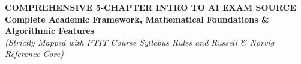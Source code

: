 \documentclass[../main.tex]{subfiles}
\begin{document}

\begin{center}
    \textbf{\LARGE COMPREHENSIVE 5-CHAPTER INTRO TO AI EXAM SOURCE} \\
    \vspace{0.2cm}
    \textbf{\LARGE Complete Academic Framework, Mathematical Foundations \& Algorithmic Features} \\
    \textit{(Strictly Mapped with PTIT Course Syllabus Rules and Russell \& Norvig Reference Core)}
\end{center}

\vspace{0.5cm}
\end{document}

